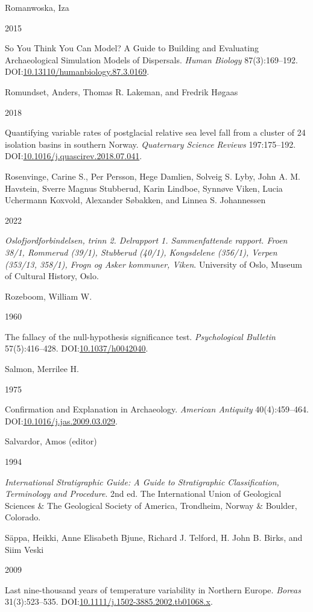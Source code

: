 \documentclass[
  a4paper,
  oneside]{uiophdthesis}
\newlength{\cslhangindent}
\newlength{\csllabelwidth}
\newlength{\cslentryspacingunit} %
\newenvironment{CSLReferences}[2] %
 {%
  \setlength{\parindent}{0pt}
  \ifodd #1
  \let\oldpar\par
  \def\par{\hangindent=\cslhangindent\oldpar}
  \fi
  \setlength{\parskip}{#2\cslentryspacingunit}
 }%
 {}
\newcommand{\CSLBlock}[1]{#1\hfill\break}
\newcommand{\CSLLeftMargin}[1]{\parbox[t]{\csllabelwidth}{#1}}
\newcommand{\CSLRightInline}[1]{\parbox[t]{\linewidth - \csllabelwidth}{#1}\break}
\begin{document}
\begin{CSLReferences}{0}{0}
\leavevmode{}%
\CSLBlock{Romanwoska, Iza}
\CSLLeftMargin{ 2015}
\CSLRightInline{So You Think You Can Model? A Guide to Building and Evaluating Archaeological Simulation Models of Dispersals. \emph{Human Biology} 87(3):169--192. DOI:\href{https://doi.org/10.13110/humanbiology.87.3.0169}{10.13110/humanbiology.87.3.0169}.}

\leavevmode{}%
\CSLBlock{Romundset, Anders, Thomas R. Lakeman, and Fredrik Høgaas}
\CSLLeftMargin{ 2018}
\CSLRightInline{Quantifying variable rates of postglacial relative sea level fall from a cluster of 24 isolation basins in southern Norway. \emph{Quaternary Science Reviews} 197:175--192. DOI:\href{https://doi.org/10.1016/j.quascirev.2018.07.041}{10.1016/j.quascirev.2018.07.041}.}

\leavevmode{}%
\CSLBlock{Rosenvinge, Carine S., Per Persson, Hege Damlien, Solveig S. Lyby, John A. M. Havstein, Sverre Magnus Stubberud, Karin Lindboe, Synnøve Viken, Lucia Uchermann Koxvold, Alexander Søbakken, and Linnea S. Johannessen}
\CSLLeftMargin{ 2022}
\CSLRightInline{\emph{{Oslofjordforbindelsen, trinn 2. Delrapport 1. Sammenfattende rapport. Froen 38/1, Rommerud (39/1), Stubberud (40/1), Kongsdelene (356/1), Verpen (353/13, 358/1), Frogn og Asker kommuner, Viken}}. University of Oslo, Museum of Cultural History, Oslo.}

\leavevmode{}%
\CSLBlock{Rozeboom, William W.}
\CSLLeftMargin{ 1960}
\CSLRightInline{The fallacy of the null-hypothesis significance test. \emph{Psychological Bulletin} 57(5):416--428. DOI:\href{https://doi.org/10.1037/h0042040}{10.1037/h0042040}.}

\leavevmode{}%
\CSLBlock{Salmon, Merrilee H.}
\CSLLeftMargin{ 1975}
\CSLRightInline{{Confirmation and Explanation in Archaeology}. \emph{American Antiquity} 40(4):459--464. DOI:\href{https://doi.org/10.1016/j.jas.2009.03.029}{10.1016/j.jas.2009.03.029}.}

\leavevmode{}%
\CSLBlock{Salvardor, Amos (editor)}
\CSLLeftMargin{ 1994}
\CSLRightInline{\emph{{International Stratigraphic Guide: A Guide to Stratigraphic Classification, Terminology and Procedure}}. 2nd ed. The International Union of Geological Sciences \& The Geological Society of America, Trondheim, Norway \& Boulder, Colorado.}

\leavevmode{}%
\CSLBlock{Säppa, Heikki, Anne Elisabeth Bjune, Richard J. Telford, H. John B. Birks, and Siim Veski}
\CSLLeftMargin{ 2009}
\CSLRightInline{{Last nine-thousand years of temperature variability in Northern Europe}. \emph{Boreas} 31(3):523--535. DOI:\href{https://doi.org/10.1111/j.1502-3885.2002.tb01068.x}{10.1111/j.1502-3885.2002.tb01068.x}.}


\end{CSLReferences}
\end{document}

